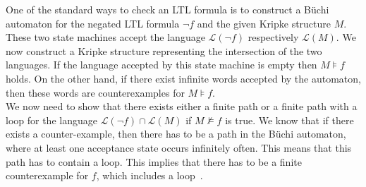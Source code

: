 One of the standard ways to check an LTL formula is to construct a Büchi
automaton for the negated LTL formula $¬f$ and the given Kripke structure $M$.
These two state machines accept the language $ℒ(¬f)$ respectively $ℒ(M)$. We
now construct a Kripke structure representing the intersection of the two
languages. If the language accepted by this state machine is empty then $M⊧f$
holds. On the other hand, if there exist infinite words accepted by the
automaton, then these words are counterexamples for $M⊧f$.\\

We now need to show that there exists either a finite path or a finite path
with a loop for the language $ℒ(¬f) ∩ ℒ(M)$ if $M⊭f$ is true. We know that if
there exists a counter-example, then there has to be a path in the Büchi
automaton, where at least one acceptance state occurs infinitely often. This
means that this path has to contain a loop. This implies that there has to be
a finite counterexample for $f$, which includes a
loop~\cite{Norrish2010TemporalLogic}.

